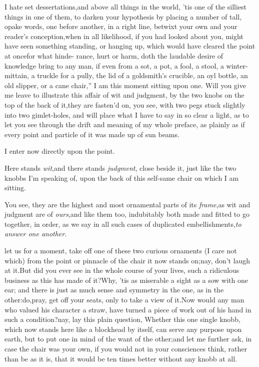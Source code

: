 \documentclass{article}
\begin{document}
I hate set dessertations,\tsh and above all things in
the world, ’tis one of the silliest things in one of them, to
darken your hypothesis by placing a number of tall, opake words,
one before another, in a right line, betwixt your own and your
reader’s conception,\tsh when in all likelihood, if you had
looked about you, might have seen something standing, or hanging
up, which would have cleared the point at
once\tsk \lqq for what hinde-\break
\lqq rance, hurt or harm, doth the laudable\break
\lqq desire of knowledge bring to any man,\break
\lqq if even from a sot, a pot, a fool, a stool, a\break
\lqq winter-mittain, a truckle for a pully,\break
\lqq the lid of a goldsmith’s crucible, an oyl\break
\lqq bottle, an old slipper, or a cane chair,”\break
\tsk I am this moment sitting upon one. Will you give me leave
to illustrate this affair of wit and judgment, by the two knobs
on the top of the back of it,\tsh\break they are fasten’d on,
you see, with two pegs stuck slightly into two gimlet-holes, and
will place what I have to say in so clear a light, as to let you
see through the drift and meaning of my whole preface, as
plainly as if every point and particle of it was made up of sun
beams.

I enter now directly upon the point.

\tsh Here stands \textit{wit},\tsh and there stands
\textit{judgment}, close beside it, just like the two knobbs I’m
speaking of, upon the back of this self-same chair on which I am
sitting.

\tsk You see, they are the highest and most ornamental parts of
its \textit{frame},\tsk as wit and judgment are of
\textit{ours},\tsk and like them too, indubitably both made and
fitted to go together, in order, as we say in all such cases of
duplicated embellishments,\tsh \textit{to answer one another}.

\noindent{}
 let us for
a moment, take off one of these two curious ornaments (I care
not which) from the point or pinnacle of the chair it
now stands on;\tsh nay, don’t laugh at it.\tsk But did you ever
see in the whole course of your lives, such a ridiculous
business as this has made of it?\tsk Why, ’tis as miserable a
sight as a sow with one ear; and there is just as much sense and
symmetry in the one, as in the other:\tsk do,\tsk pray, get off
your seats, only to take a view of it.\tsh Now would any man who
valued his character a straw, have turned a piece of work out of
his hand in such a condition?\tsk nay, lay  this plain question, Whether this
one single knobb, which now stands here like a blockhead by
itself, can serve any purpose upon earth, but to put one in mind
of the want of the other;\tsh and let me further ask, in case
the chair was your own, if you would not in your consci\-ences
think, rather than be as it is, that it would be ten
times better without any knobb at all.
\end{document}
